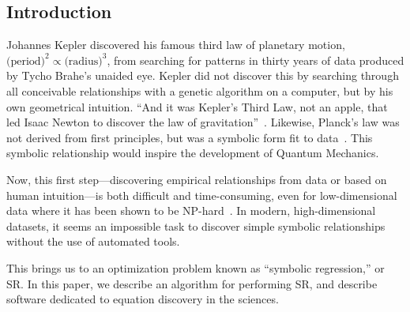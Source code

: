 \documentclass[letterpaper,twocolumn]{scrartcl}
\begin{document}
\addtocounter{footnote}{-1}
\addtocounter{footnote}{1}




\begin{linenumbers}


\section{Introduction}
\label{sec:intro_pysr}








Johannes Kepler discovered his famous third law of planetary motion, $\text{(period)}^2 \propto \text{(radius)}^3$, from searching for patterns in thirty years of data produced by Tycho Brahe's unaided eye.
Kepler did not discover this by searching through all conceivable relationships with a genetic algorithm on a computer, but by his own geometrical intuition. 
``And it was Kepler's Third Law, not an apple, that led Isaac Newton to discover the law of gravitation''~\cite{hawkingShouldersGiantsGreat2004}.
Likewise, Planck's law was not derived from first principles, but was a symbolic form fit to data~\cite{planckUeberVerbesserungWien1900}.
This symbolic relationship would inspire the development of Quantum Mechanics.

Now, this first step---discovering empirical relationships from data or based on human intuition---is both difficult and time-consuming, even for low-dimensional data where it has been shown to be NP-hard~\cite{virgolinSymbolicRegressionNPhard2022}.
In modern, high-dimensional datasets, it seems an impossible task to discover simple symbolic relationships without the use of automated tools.

This brings us to an optimization problem known as ``symbolic regression,'' or SR.
In this paper, we describe an algorithm for performing SR, and describe software dedicated to equation discovery in the sciences.


\end{linenumbers}
\end{document}
